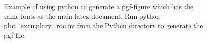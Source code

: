 


\graphicspath{{5/figures/}}


\begin{figure}[htb]
  \centering

\resizebox{1\textwidth}{!}{}

  \caption[Example of a ROC curve]{ Example of using python to generate a pgf-figure which has the same fonts as the main latex document. Run python plot\_exemplary\_roc.py from the Python directory to generate the pgf-file. }
  \label{fig:ROC_curve}
\end{figure}  





